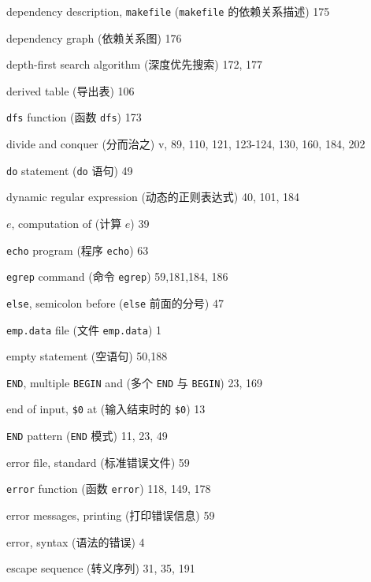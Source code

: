 \begin{multicols}{3}
\hangindent=3pc  dependency description, \verb'makefile'
(\verb'makefile' 的依赖关系描述) 175

\hangindent=3pc  dependency graph (依赖关系图) 176

\hangindent=3pc  depth-first search algorithm (深度优先搜索) 172, 177

\hangindent=3pc  derived table (导出表) 106

\hangindent=3pc  \verb'dfs' function (函数 \verb'dfs') 173

\hangindent=3pc  divide and conquer (分而治之) v, 89, 110, 121, 123-124, 130, 160, 184, 202

\hangindent=3pc  \verb'do' statement (\verb'do' 语句) 49

\hangindent=3pc  dynamic regular expression (动态的正则表达式) 40,  101, 184

\hangindent=3pc  $e$, computation of (计算 $e$) 39

\hangindent=3pc  \verb'echo' program (程序 \verb'echo') 63

\hangindent=3pc  \verb'egrep' command (命令 \verb'egrep') 59,181,184, 186

\hangindent=3pc  \verb'else', semicolon before (\verb'else'
前面的分号) 47

\hangindent=3pc  \verb'emp.data' file (文件 \verb'emp.data') 1

\hangindent=3pc  empty statement (空语句) 50,188

\hangindent=3pc  \verb'END', multiple \verb'BEGIN' and (多个
\verb'END' 与 \verb'BEGIN') 23, 169

\hangindent=3pc  end of input, \verb'$0' at (输入结束时的
\verb'$0') 13

\hangindent=3pc  \verb'END' pattern (\verb'END' 模式) 11, 23, 49

\hangindent=3pc  error file, standard (标准错误文件) 59

\hangindent=3pc  \verb'error' function (函数 \verb'error')
118, 149, 178

\hangindent=3pc  error messages, printing (打印错误信息) 59

\hangindent=3pc  error, syntax (语法的错误) 4

\hangindent=3pc  escape sequence (转义序列) 31, 35, 191


\end{multicols}
